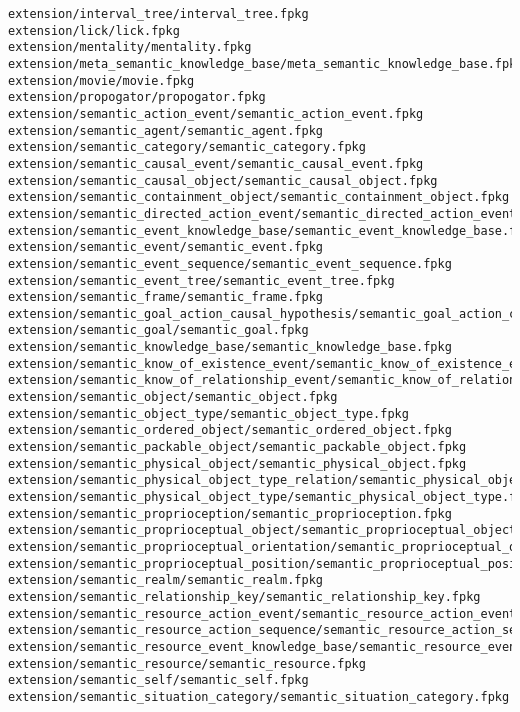 \begin{lstlisting}
extension/interval_tree/interval_tree.fpkg
extension/lick/lick.fpkg
extension/mentality/mentality.fpkg
extension/meta_semantic_knowledge_base/meta_semantic_knowledge_base.fpkg
extension/movie/movie.fpkg
extension/propogator/propogator.fpkg
extension/semantic_action_event/semantic_action_event.fpkg
extension/semantic_agent/semantic_agent.fpkg
extension/semantic_category/semantic_category.fpkg
extension/semantic_causal_event/semantic_causal_event.fpkg
extension/semantic_causal_object/semantic_causal_object.fpkg
extension/semantic_containment_object/semantic_containment_object.fpkg
extension/semantic_directed_action_event/semantic_directed_action_event.fpkg
extension/semantic_event_knowledge_base/semantic_event_knowledge_base.fpkg
extension/semantic_event/semantic_event.fpkg
extension/semantic_event_sequence/semantic_event_sequence.fpkg
extension/semantic_event_tree/semantic_event_tree.fpkg
extension/semantic_frame/semantic_frame.fpkg
extension/semantic_goal_action_causal_hypothesis/semantic_goal_action_causal_hypothesis.fpkg
extension/semantic_goal/semantic_goal.fpkg
extension/semantic_knowledge_base/semantic_knowledge_base.fpkg
extension/semantic_know_of_existence_event/semantic_know_of_existence_event.fpkg
extension/semantic_know_of_relationship_event/semantic_know_of_relationship_event.fpkg
extension/semantic_object/semantic_object.fpkg
extension/semantic_object_type/semantic_object_type.fpkg
extension/semantic_ordered_object/semantic_ordered_object.fpkg
extension/semantic_packable_object/semantic_packable_object.fpkg
extension/semantic_physical_object/semantic_physical_object.fpkg
extension/semantic_physical_object_type_relation/semantic_physical_object_type_relation.fpkg
extension/semantic_physical_object_type/semantic_physical_object_type.fpkg
extension/semantic_proprioception/semantic_proprioception.fpkg
extension/semantic_proprioceptual_object/semantic_proprioceptual_object.fpkg
extension/semantic_proprioceptual_orientation/semantic_proprioceptual_orientation.fpkg
extension/semantic_proprioceptual_position/semantic_proprioceptual_position.fpkg
extension/semantic_realm/semantic_realm.fpkg
extension/semantic_relationship_key/semantic_relationship_key.fpkg
extension/semantic_resource_action_event/semantic_resource_action_event.fpkg
extension/semantic_resource_action_sequence/semantic_resource_action_sequence.fpkg
extension/semantic_resource_event_knowledge_base/semantic_resource_event_knowledge_base.fpkg
extension/semantic_resource/semantic_resource.fpkg
extension/semantic_self/semantic_self.fpkg
extension/semantic_situation_category/semantic_situation_category.fpkg

\end{lstlisting}
